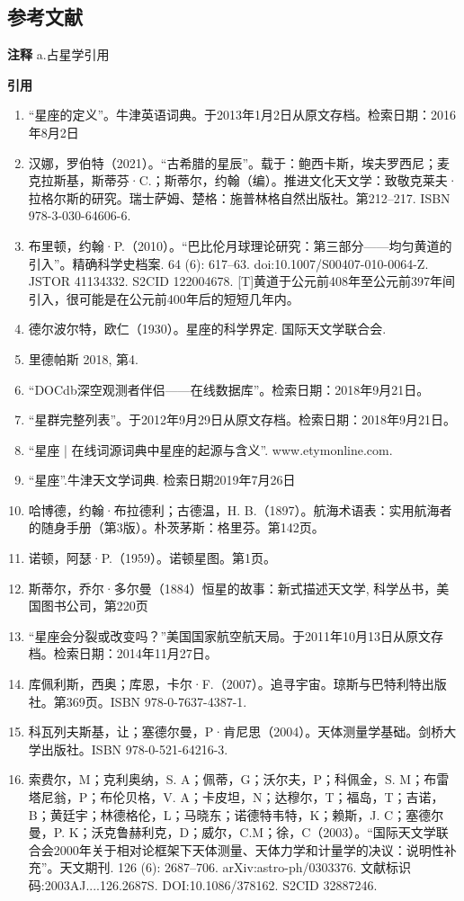 \subsection{参考文献} 
\textbf{注释}
a.占星学引用

\textbf{引用}
\begin{enumerate}
\item “星座的定义”。牛津英语词典。于2013年1月2日从原文存档。检索日期：2016年8月2日
\item 汉娜，罗伯特（2021）。“古希腊的星辰”。载于：鲍西卡斯，埃夫罗西尼；麦克拉斯基，斯蒂芬·C.；斯蒂尔，约翰（编）。推进文化天文学：致敬克莱夫·拉格尔斯的研究。瑞士萨姆、楚格：施普林格自然出版社。第212–217. ISBN 978-3-030-64606-6.
\item 布里顿，约翰·P.（2010）。“巴比伦月球理论研究：第三部分——均匀黄道的引入”。精确科学史档案. 64 (6): 617–63. doi:10.1007/S00407-010-0064-Z. JSTOR 41134332. S2CID 122004678. [T]黄道于公元前408年至公元前397年间引入，很可能是在公元前400年后的短短几年内。
\item 德尔波尔特，欧仁（1930）。星座的科学界定. 国际天文学联合会.
\item 里德帕斯 2018, 第4.
\item “DOCdb深空观测者伴侣——在线数据库”。检索日期：2018年9月21日。
\item “星群完整列表”。于2012年9月29日从原文存档。检索日期：2018年9月21日。
\item “星座 | 在线词源词典中星座的起源与含义”. www.etymonline.com.
\item “星座”.牛津天文学词典. 检索日期2019年7月26日
\item 哈博德，约翰·布拉德利；古德温，H. B.（1897）。航海术语表：实用航海者的随身手册（第3版）。朴茨茅斯：格里芬。第142页。
\item 诺顿，阿瑟·P.（1959）。诺顿星图。第1页。
\item 斯蒂尔，乔尔·多尔曼（1884）恒星的故事：新式描述天文学, 科学丛书，美国图书公司，第220页
\item “星座会分裂或改变吗？”美国国家航空航天局。于2011年10月13日从原文存档。检索日期：2014年11月27日。
\item 库佩利斯，西奥；库恩，卡尔·F.（2007）。追寻宇宙。琼斯与巴特利特出版社。第369页。ISBN 978-0-7637-4387-1.
\item 科瓦列夫斯基，让；塞德尔曼，P·肯尼思（2004）。天体测量学基础。剑桥大学出版社。ISBN 978-0-521-64216-3.
\item 索费尔，M；克利奥纳，S. A；佩蒂，G；沃尔夫，P；科佩金，S. M；布雷塔尼翁，P；布伦贝格，V. A；卡皮坦，N；达穆尔，T；福岛，T；吉诺，B；黄廷宇；林德格伦，L；马晓东；诺德特韦特，K；赖斯，J. C；塞德尔曼，P. K；沃克鲁赫利克，D；威尔，C.M；徐，C（2003）。“国际天文学联合会2000年关于相对论框架下天体测量、天体力学和计量学的决议：说明性补充”。天文期刊. 126 (6): 2687–706. arXiv:astro-ph/0303376. 文献标识码:2003AJ....126.2687S. DOI:10.1086/378162. S2CID 32887246.

\end{enumerate}
